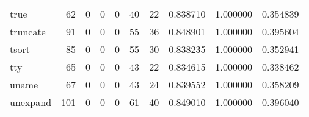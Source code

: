 \begin{longtable}{lrrrrrrrrr}
true      &                                    62 &                                                  0 &                                                  0 &                                                  0 &                                                 40 &                                                 22 &                                           0.838710 &                               1.000000 &                             0.354839 \\
truncate  &                                    91 &                                                  0 &                                                  0 &                                                  0 &                                                 55 &                                                 36 &                                           0.848901 &                               1.000000 &                             0.395604 \\
tsort     &                                    85 &                                                  0 &                                                  0 &                                                  0 &                                                 55 &                                                 30 &                                           0.838235 &                               1.000000 &                             0.352941 \\
tty       &                                    65 &                                                  0 &                                                  0 &                                                  0 &                                                 43 &                                                 22 &                                           0.834615 &                               1.000000 &                             0.338462 \\
uname     &                                    67 &                                                  0 &                                                  0 &                                                  0 &                                                 43 &                                                 24 &                                           0.839552 &                               1.000000 &                             0.358209 \\
unexpand  &                                   101 &                                                  0 &                                                  0 &                                                  0 &                                                 61 &                                                 40 &                                           0.849010 &                               1.000000 &                             0.396040 \\

\end{longtable}
